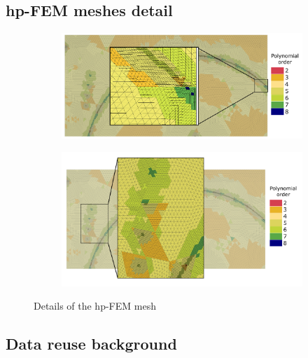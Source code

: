 \documentclass{beamer}
\begin{document}
\subsection{hp-FEM meshes detail}
\begin{frame}
\begin{center}
	\begin{figure}[h!]
	\centering
	\begin{subfigure}{.6\textwidth}
		\centering
		\includegraphics[width=\textwidth]{final_mesh-detail-1.png}
	\end{subfigure}
	\begin{subfigure}{.6\textwidth}
		\centering
		\includegraphics[width=\textwidth]{final_mesh-detail-2.png}
	\end{subfigure}
	\caption{Details of the hp-FEM mesh}
	\end{figure}
\end{center}
\end{frame}

\subsection{Data reuse background}
\end{document}
